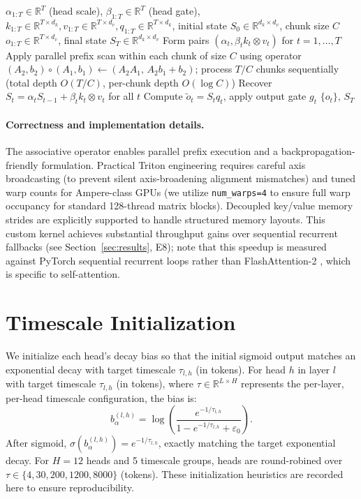 \documentclass{article}
\newcommand{\R}{\mathbb{R}}
\newcommand{\epszero}{\varepsilon_0}
\begin{document}
\begin{algorithm}
\caption{Nitro Parallel Scan (Triton, per head)}
\begin{algorithmic}[1]
\Require $\alpha_{1:T} \in \R^T$ (head scale), $\beta_{1:T} \in \R^T$ (head gate), $k_{1:T} \in \R^{T \times d_k}, v_{1:T} \in \R^{T \times d_v}, q_{1:T} \in \R^{T \times d_k}$, initial state $S_0 \in \R^{d_k \times d_v}$, chunk size $C$
\Ensure $o_{1:T} \in \R^{T \times d_v}$, final state $S_T \in \R^{d_k \times d_v}$
\State Form pairs $(\alpha_t, \beta_t k_t \otimes v_t)$ for $t = 1, \ldots, T$
\State Apply parallel prefix scan within each chunk of size $C$ using operator
       $(A_2, b_2) \circ (A_1, b_1) \gets (A_2 A_1,\, A_2 b_1 + b_2)$;
       process $T/C$ chunks sequentially (total depth $O(T/C)$, per-chunk depth $O(\log C)$)
\State Recover $S_t = \alpha_t S_{t-1} + \beta_t k_t \otimes v_t$ for all $t$
\State Compute $\tilde{o}_t = S_t q_t$, apply output gate $g_t$
\State \Return $\{o_t\}$, $S_T$
\end{algorithmic}
\end{algorithm}

\paragraph{Correctness and implementation details.} The associative operator enables parallel prefix execution and a backpropagation-friendly formulation. Practical Triton engineering requires careful axis broadcasting (to prevent silent axis-broadening alignment mismatches) and tuned warp counts for Ampere-class GPUs (we utilize \texttt{num\_warps=4} to ensure full warp occupancy for standard 128-thread matrix blocks). Decoupled key/value memory strides are explicitly supported to handle structured memory layouts. This custom kernel achieves substantial throughput gains over sequential recurrent fallbacks (see Section~\ref{sec:results}, E8); note that this speedup is measured against PyTorch sequential recurrent loops rather than FlashAttention-2 \cite{dao2023flashattention2}, which is specific to self-attention.

\section{Timescale Initialization}
\label{sec:timescale_init}

We initialize each head's decay bias so that the initial sigmoid output
matches an exponential decay with target timescale $\tau_{l,h}$ (in tokens).
For head $h$ in layer $l$ with target timescale $\tau_{l,h}$ (in tokens), where $\tau \in \R^{L \times H}$ represents the per-layer, per-head timescale configuration, the bias is:
\begin{equation}
  b_\alpha^{(l,h)} = \log\!\left(\frac{e^{-1/\tau_{l,h}}}{1 - e^{-1/\tau_{l,h}} + \epszero}\right).
\end{equation}
After sigmoid, $\sigma(b_\alpha^{(l,h)}) = e^{-1/\tau_{l,h}}$, exactly matching the
target exponential decay. For $H{=}12$ heads and 5 timescale groups, heads are
round-robined over $\tau \in \{4, 30, 200, 1200, 8000\}$ (tokens). These
initialization heuristics are recorded here to ensure reproducibility.
\end{document}
